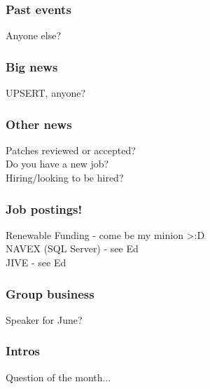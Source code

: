 \documentclass{beamer}
\begin{document}
\frame
{
  \frametitle{Past events}
  \begin{center}
Anyone else?\\
  \end{center}
}

\frame
{
  \frametitle{Big news}
  \begin{center}
UPSERT, anyone?\\
  \end{center}
}
\frame
{
  \frametitle{Other news}
  \begin{center}
Patches reviewed or accepted?\\
Do you have a new job?\\
Hiring/looking to be hired?\\
  \end{center}
}

\frame
{
  \frametitle{Job postings!}
  \begin{center}
Renewable Funding - come be my minion >:D\\
\vspace{5 mm}
NAVEX (SQL Server) - see Ed\\
\vspace{5 mm}
JIVE - see Ed \\
  \end{center}
}

\frame
{
  \frametitle{Group business}
  \begin{center}
Speaker for June?\\
  \end{center}
}

\frame
{
  \frametitle{Intros}
  \begin{center}
Question of the month...\\
  \end{center}
}
\end{document}
